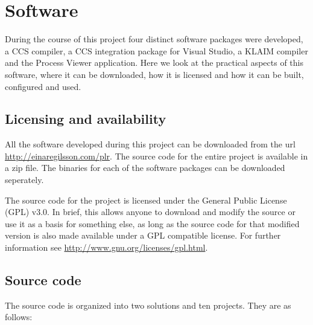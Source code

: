 \appendix

\chapter{Software}

	During the course of this project four distinct software packages were 
	developed, a CCS compiler, a CCS integration package for Visual Studio, a 
	KLAIM compiler and the Process Viewer application. Here we look at the 
	practical aspects of this software, where it can be downloaded, how it is 
	licensed and how it can be built, configured and used.

\section{Licensing and availability}

	All the software developed during this project can be downloaded from the 
	url \url{http://einaregilsson.com/plr}. The source code for the entire 
	project is available in a zip file. The binaries for each of the software 
	packages can be downloaded seperately. 
	
	The source code for the project is licensed under the General Public License 
	(GPL) v3.0. In brief, this allows anyone to download and modify the source or
	use it as a basis for something else, as long as the source code for that 
	modified version is also made available under a GPL compatible license. For 
	further information see \url{http://www.gnu.org/licenses/gpl.html}.


\section{Source code}
	
	The source code is organized into two solutions and ten projects. They are 
	as follows:
	
